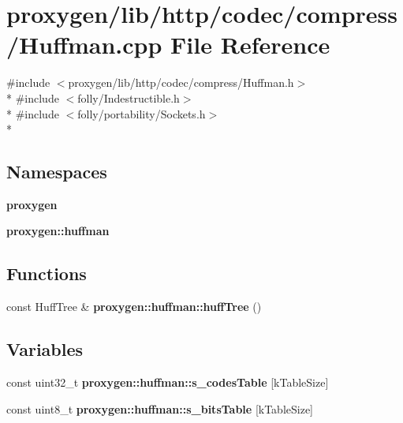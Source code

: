 \section{proxygen/lib/http/codec/compress/\+Huffman.cpp File Reference}
\label{Huffman_8cpp}
{\ttfamily \#include $<$proxygen/lib/http/codec/compress/\+Huffman.\+h$>$}\\*
{\ttfamily \#include $<$folly/\+Indestructible.\+h$>$}\\*
{\ttfamily \#include $<$folly/portability/\+Sockets.\+h$>$}\\*
\subsection*{Namespaces}
\begin{DoxyCompactItemize}
\item 
 {\bf proxygen}
\item 
 {\bf proxygen\+::huffman}
\end{DoxyCompactItemize}
\subsection*{Functions}
\begin{DoxyCompactItemize}
\item 
const Huff\+Tree \& {\bf proxygen\+::huffman\+::huff\+Tree} ()
\end{DoxyCompactItemize}
\subsection*{Variables}
\begin{DoxyCompactItemize}
\item 
const uint32\+\_\+t {\bf proxygen\+::huffman\+::s\+\_\+codes\+Table} [k\+Table\+Size]
\item 
const uint8\+\_\+t {\bf proxygen\+::huffman\+::s\+\_\+bits\+Table} [k\+Table\+Size]
\end{DoxyCompactItemize}
